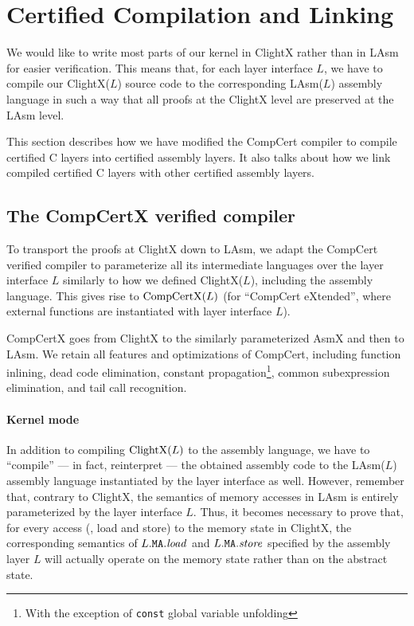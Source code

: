 \section{Certified Compilation and Linking}
\label{sec:seq:comp}

We would like to write most parts of our kernel in ClightX rather than
in LAsm for easier verification.  This means that, for
each layer interface $L$, we have to compile our ClightX($L$) source code to the
corresponding LAsm($L$) assembly language in such a way that all
proofs at the ClightX level are preserved at the LAsm
level.

This section describes how we have modified the CompCert compiler to
compile certified C layers into certified assembly layers. It also talks about
how we link compiled certified C layers with other certified assembly layers. 

\subsection{The CompCertX verified compiler}
\label{sec:seq:comp:concrete}
To transport the proofs at ClightX down to LAsm, we adapt the CompCert
verified compiler to parameterize all
its intermediate languages over the layer interface $L$ similarly to
how we defined ClightX($L$), including the assembly language. This gives rise to
$\textrm{CompCertX(}L\textrm{)}$ (for ``CompCert eXtended'', where external functions
are instantiated with layer interface $L$).

CompCertX goes from ClightX to the similarly parameterized AsmX and
then to LAsm. We retain all features and optimizations of CompCert,
including function inlining, dead code elimination, 
constant
propagation\footnote{With the exception of \texttt{const} global
  variable unfolding},
common subexpression elimination, and tail call
recognition.


\paragraph{Kernel mode}

In addition to compiling $\textrm{ClightX(}L\textrm{)}$ to the assembly
language,  
we have to ``compile'' --- in fact, reinterpret
--- the obtained assembly code to the LAsm($L$) assembly language
instantiated by the layer interface as well. However, remember that, contrary to
ClightX, the semantics of memory accesses in LAsm is entirely
parameterized by the layer interface $L$. Thus, it becomes necessary to prove
that, for every access (\ie, load and store)
to the memory state in ClightX, the
corresponding semantics of $L.{\texttt{MA}}.\mathit{load}$ and
$L.{\texttt{MA}}.\mathit{store}$ specified by the assembly layer  $L$
will actually operate on the memory state rather than on the abstract
state.

